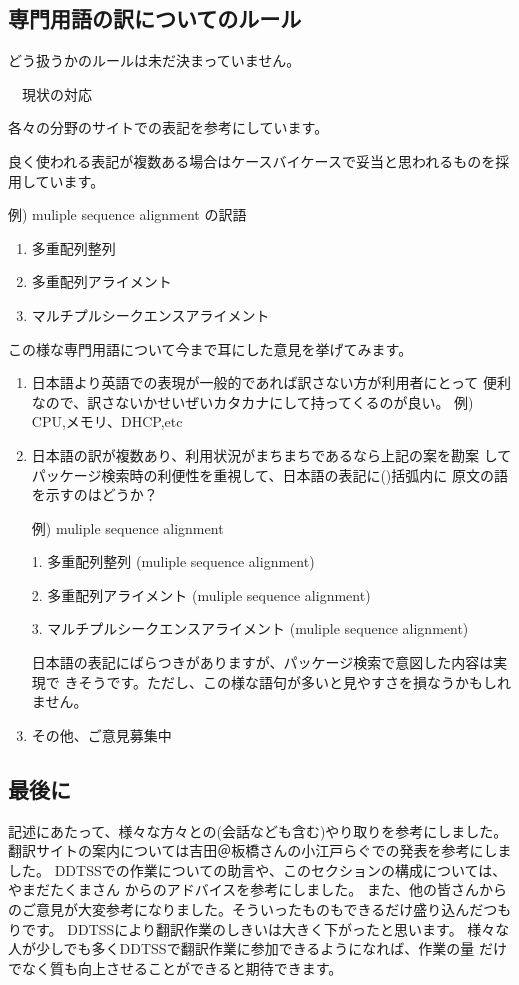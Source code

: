 \documentclass[mingoth,a4paper]{jsarticle}
\begin{document}
\subsection{専門用語の訳についてのルール}
どう扱うかのルールは未だ決まっていません。

　現状の対応

各々の分野のサイトでの表記を参考にしています。

良く使われる表記が複数ある場合はケースバイケースで妥当と思われるものを採用しています。

例) muliple sequence alignment の訳語
\begin{enumerate}
 \item 多重配列整列
 \item 多重配列アライメント
 \item マルチプルシークエンスアライメント
\end{enumerate}


この様な専門用語について今まで耳にした意見を挙げてみます。
\begin{enumerate}

 \item 日本語より英語での表現が一般的であれば訳さない方が利用者にとって
       便利なので、訳さないかせいぜいカタカナにして持ってくるのが良い。
例)
CPU,メモリ、DHCP,etc

 \item 日本語の訳が複数あり、利用状況がまちまちであるなら上記の案を勘案
       してパッケージ検索時の利便性を重視して、日本語の表記に()括弧内に
       原文の語を示すのはどうか？

例) muliple sequence alignment

 1. 多重配列整列 (muliple sequence alignment)

 2. 多重配列アライメント (muliple sequence alignment)

 3. マルチプルシークエンスアライメント (muliple sequence alignment)

日本語の表記にばらつきがありますが、パッケージ検索で意図した内容は実現で
きそうです。ただし、この様な語句が多いと見やすさを損なうかもしれません。

 \item その他、ご意見募集中
\end{enumerate}

\subsection{最後に}
記述にあたって、様々な方々との(会話なども含む)やり取りを参考にしました。
翻訳サイトの案内については吉田＠板橋さんの小江戸らぐでの発表を参考にしました。
DDTSSでの作業についての助言や、このセクションの構成については、やまだたくまさん
からのアドバイスを参考にしました。
また、他の皆さんからのご意見が大変参考になりました。そういったものもできるだけ盛り込んだつもりです。
DDTSSにより翻訳作業のしきいは大きく下がったと思います。
様々な人が少しでも多くDDTSSで翻訳作業に参加できるようになれば、作業の量
だけでなく質も向上させることができると期待できます。
\end{document}
